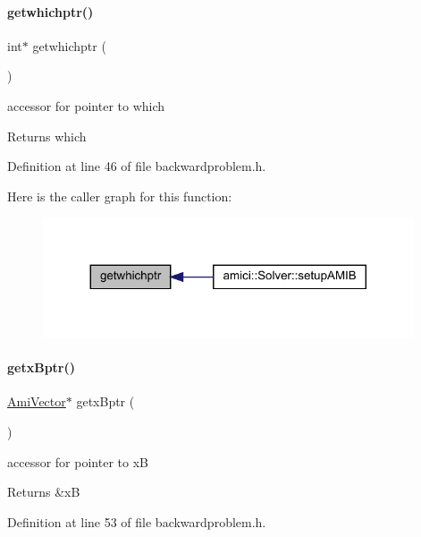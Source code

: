 \paragraph{\texorpdfstring{getwhichptr()}{getwhichptr()}}
{\footnotesize\ttfamily int$\ast$ getwhichptr (\begin{DoxyParamCaption}{ }\end{DoxyParamCaption})}

accessor for pointer to which \begin{DoxyReturn}{Returns}
which 
\end{DoxyReturn}


Definition at line 46 of file backwardproblem.\+h.

Here is the caller graph for this function\+:
\nopagebreak
\begin{figure}[H]
\begin{center}
\leavevmode
\includegraphics[width=311pt]{classamici_1_1_backward_problem_a209a0d59a5a5eebfba1e6db5cb209132_icgraph}
\end{center}
\end{figure}
\mbox{\label{classamici_1_1_backward_problem_afd910c853cb52a19b17ff8b65832fe2e}} 
\paragraph{\texorpdfstring{getx\+Bptr()}{getxBptr()}}
{\footnotesize\ttfamily \mbox{\hyperlink{classamici_1_1_ami_vector}{Ami\+Vector}}$\ast$ getx\+Bptr (\begin{DoxyParamCaption}{ }\end{DoxyParamCaption})}

accessor for pointer to xB \begin{DoxyReturn}{Returns}
\&xB 
\end{DoxyReturn}


Definition at line 53 of file backwardproblem.\+h.

